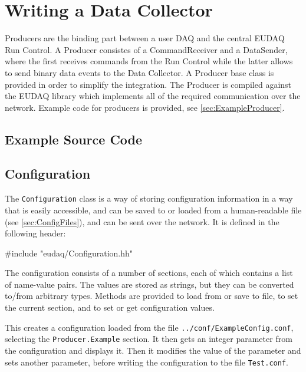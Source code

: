 \section{Writing a Data Collector}\label{sec:DataCollectorWriting}
Producers are the binding part between a user DAQ and the central EUDAQ Run Control.
A Producer consistes of a CommandReceiver and a DataSender, where the first receives commands from the Run Control while the latter allows to send binary data events to the Data Collector.
A Producer base class is provided in order to simplify the integration.
The Producer is compiled against the EUDAQ library which implements all of the required communication over the network.
Example code for producers is provided, see \autoref{sec:ExampleProducer}.

\subsection{Example Source Code}\label{sec:Ex0DataCollector_cc}
\newpage


\subsection{Configuration}
The \texttt{Configuration} class is a way of storing configuration information
in a way that is easily accessible, and can be saved to or loaded from a human-readable file
(see \autoref{sec:ConfigFiles}), and can be sent over the network.
It is defined in the following header:

\begin{listing}
#include "eudaq/Configuration.hh"
\end{listing}

The configuration consists of a number of sections,
each of which contains a list of name-value pairs.
The values are stored as strings, but they can be converted to/from arbitrary types.
Methods are provided to load from or save to file, to set the current section,
and to set or get configuration values.

This creates a configuration loaded from the file \texttt{../conf/ExampleConfig.conf},
selecting the \texttt{Producer.Example} section.
It then gets an integer parameter from the configuration and displays it.
Then it modifies the value of the parameter and sets another parameter,
before writing the configuration to the file \texttt{Test.conf}.

